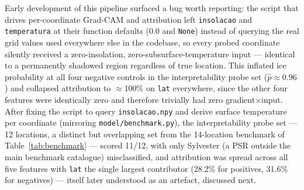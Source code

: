 \documentclass[12pt,a4paper]{article}
\begin{document}
Early development of this pipeline surfaced a bug worth reporting: the script
that drives per-coordinate Grad-CAM and attribution left \texttt{insolacao} and
\texttt{temperatura} at their function defaults (0.0 and \texttt{None}) instead
of querying the real grid values used everywhere else in the codebase, so every
probed coordinate silently received a zero-insolation, zero-subsurface-temperature
input — identical to a permanently shadowed region regardless of true location.
This inflated ice probability at all four negative controls in the interpretability
probe set ($\hat p \approx 0.96$) and collapsed attribution to $\approx$100\% on
\texttt{lat} everywhere, since the other four features were identically zero and
therefore trivially had zero gradient$\times$input. After fixing the script to
query \texttt{insolacao.npy} and derive surface temperature per coordinate
(mirroring \texttt{model/benchmark.py}), the interpretability probe set —
12 locations, a distinct but overlapping set from the 14-location benchmark of
Table~\ref{tab:benchmark} — scored 11/12, with only Sylvester (a PSR outside the
main benchmark catalogue) misclassified, and attribution was spread across all
five features with \texttt{lat} the single largest contributor (28.2\% for
positives, 31.6\% for negatives) — itself later understood as an artefact,
discussed next.
\end{document}
